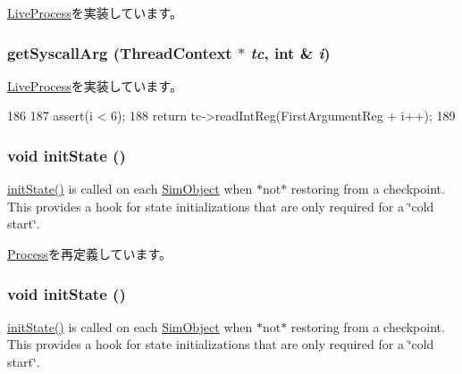 \hyperlink{classLiveProcess_aa001ff57ec460026facb89ba19c7bf96}{LiveProcess}を実装しています。\hypertarget{classMipsLiveProcess_ae30d5e2e0fa415fc951786462325dde3}{
\subsubsection[{getSyscallArg}]{ getSyscallArg ({\bf ThreadContext} $\ast$ {\em tc}, \/  int \& {\em i})}}
\label{classMipsLiveProcess_ae30d5e2e0fa415fc951786462325dde3}


\hyperlink{classLiveProcess_aa001ff57ec460026facb89ba19c7bf96}{LiveProcess}を実装しています。


\begin{DoxyCode}
186 {
187     assert(i < 6);
188     return tc->readIntReg(FirstArgumentReg + i++);
189 }
\end{DoxyCode}
\hypertarget{classMipsLiveProcess_a3c34ea9b29f410748d4435a667484924}{
\subsubsection[{initState}]{\setlength{\rightskip}{0pt plus 5cm}void initState ()}}
\label{classMipsLiveProcess_a3c34ea9b29f410748d4435a667484924}
\hyperlink{classMipsLiveProcess_a3c34ea9b29f410748d4435a667484924}{initState()} is called on each \hyperlink{classSimObject}{SimObject} when $\ast$not$\ast$ restoring from a checkpoint. This provides a hook for state initializations that are only required for a \char`\"{}cold start\char`\"{}. 

\hyperlink{classProcess_a3c34ea9b29f410748d4435a667484924}{Process}を再定義しています。\hypertarget{classMipsLiveProcess_a3c34ea9b29f410748d4435a667484924}{
\subsubsection[{initState}]{\setlength{\rightskip}{0pt plus 5cm}void initState ()}}
\label{classMipsLiveProcess_a3c34ea9b29f410748d4435a667484924}
\hyperlink{classMipsLiveProcess_a3c34ea9b29f410748d4435a667484924}{initState()} is called on each \hyperlink{classSimObject}{SimObject} when $\ast$not$\ast$ restoring from a checkpoint. This provides a hook for state initializations that are only required for a \char`\"{}cold start\char`\"{}. 


